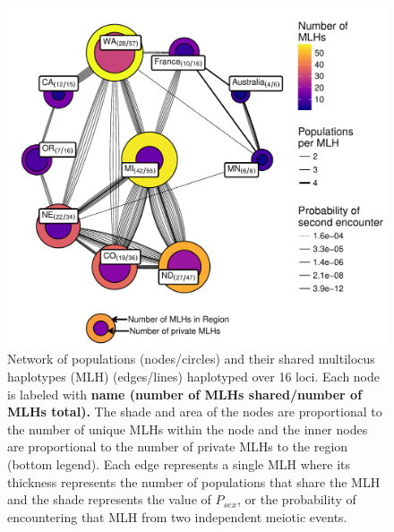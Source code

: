 \documentclass[fleqn,10pt,lineno]{wlpeerj} %
\theoremstyle{definition}
\theoremstyle{definition}
\theoremstyle{definition}
\theoremstyle{remark}
\begin{document}
\begin{figure}
\centering
\includegraphics[width=1.00000\textwidth]{../../results/figures/publication/mlg-16.pdf}
\caption{Network of populations (nodes/circles) and their shared
multilocus haplotypes (MLH) (edges/lines) haplotyped over 16 loci. Each
node is labeled with \textbf{name (number of MLHs shared/number of MLHs
total).} The shade and area of the nodes are proportional to the number
of unique MLHs within the node and the inner nodes are proportional to
the number of private MLHs to the region (bottom legend). Each edge
represents a single MLH where its thickness represents the number of
populations that share the MLH and the shade represents the value of
\(P_{sex}\), or the probability of encountering that MLH from two
independent meiotic events.}\label{community-graph16}
\end{figure}
\end{document}
